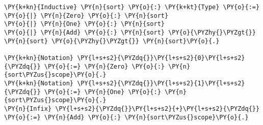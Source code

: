 \begin{Verbatim}[commandchars=\\\{\}]
\PY{k+kn}{Inductive} \PY{n}{sort} \PY{o}{:} \PY{k+kt}{Type} \PY{o}{:=}
\PY{o}{|} \PY{n}{Zero} \PY{o}{:} \PY{n}{sort}
\PY{o}{|} \PY{n}{One} \PY{o}{:} \PY{n}{sort}
\PY{o}{|} \PY{n}{Add} \PY{o}{:} \PY{n}{sort} \PY{o}{\PYZhy{}\PYZgt{}} \PY{n}{sort} \PY{o}{\PYZhy{}\PYZgt{}} \PY{n}{sort}\PY{o}{.}

\PY{k+kn}{Notation} \PY{l+s+s2}{\PYZdq{}}\PY{l+s+s2}{0}\PY{l+s+s2}{\PYZdq{}} \PY{o}{:=} \PY{n}{Zero} \PY{o}{:} \PY{n}{sort\PYZus{}scope}\PY{o}{.}
\PY{k+kn}{Notation} \PY{l+s+s2}{\PYZdq{}}\PY{l+s+s2}{1}\PY{l+s+s2}{\PYZdq{}} \PY{o}{:=} \PY{n}{One} \PY{o}{:} \PY{n}{sort\PYZus{}scope}\PY{o}{.}
\PY{n}{Infix} \PY{l+s+s2}{\PYZdq{}}\PY{l+s+s2}{+}\PY{l+s+s2}{\PYZdq{}} \PY{o}{:=} \PY{n}{Add} \PY{o}{:} \PY{n}{sort\PYZus{}scope}\PY{o}{.}
\end{Verbatim}
